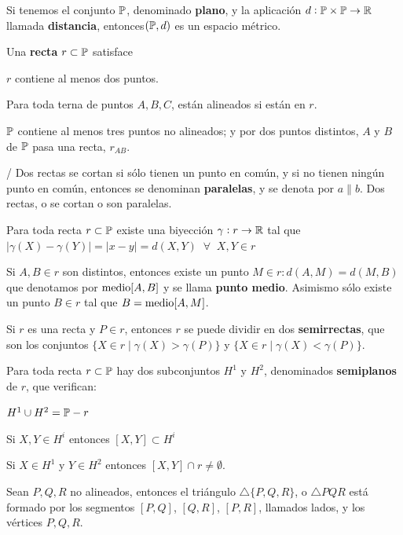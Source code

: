 	 Si tenemos el conjunto $\P$, denominado \textbf{plano}, y la aplicación $d:\P \times \P \rightarrow \R$ llamada \textbf{distancia}, entonces$(\P, d)$ es un espacio métrico.

 Una \textbf{recta} $r \subset \P$ satisface
\begin{itemizex}
	\item $r$ contiene al menos dos puntos.
	\item Para toda terna de puntos $A, B, C$, están alineados si están en $r$.
\end{itemizex}

 $\P$ contiene al menos tres puntos no alineados; y por dos puntos distintos, $A$ y $B$ de $\P$ pasa una recta, $r_{AB}$.

 /  Dos rectas se cortan si sólo tienen un punto en común, y si no tienen ningún punto en común, entonces se denominan \textbf{paralelas}, y se denota por $a \parallel b$. Dos rectas, o se cortan o son paralelas.

\importante{} Para toda recta $r \subset \P$ existe una biyección $\gamma: r \rightarrow \R$ tal que $|\gamma(X) - \gamma(Y)| = |x - y| = d(X, Y) \;\; \forall \;\; X,Y \in r$ 

 Si $A, B \in r$ son distintos, entonces existe un punto $M\in r: d(A,M) = d(M,B)$ que denotamos por $\m[A,B]$ y se llama \textbf{punto medio}. Asimismo sólo existe un punto $B \in r$ tal que $B = \m[A, M]$.

 Si $r$ es una recta y $P \in r$, entonces $r$ se puede dividir en dos \textbf{semirrectas}, que son los conjuntos $\{X \in r \; | \; \gamma(X) > \gamma(P)\}$ y $\{X \in r \; | \; \gamma(X) < \gamma(P)\}$.

 Para toda recta $r \subset \P$ hay dos subconjuntos $H^1$ y $H^2$, denominados \textbf{semiplanos} de $r$, que verifican:
\begin{itemizex}
	\item $H^1 \cup H^2 = \P-r$
	\item Si $X,Y \in H^i$ entonces $[X,Y] \subset H^i$
	\item Si $X \in H^1$ y $Y \in H^2$ entonces $[X,Y] \cap r \neq \emptyset$.
\end{itemizex}

 Sean $P, Q, R$ no alineados, entonces el triángulo $\triangle\{P,Q,R\}$, o $\triangle PQR$ está formado por los segmentos $[P,Q]$, $[Q,R]$, $[P,R]$, llamados lados, y los vértices $P,Q, R$.

